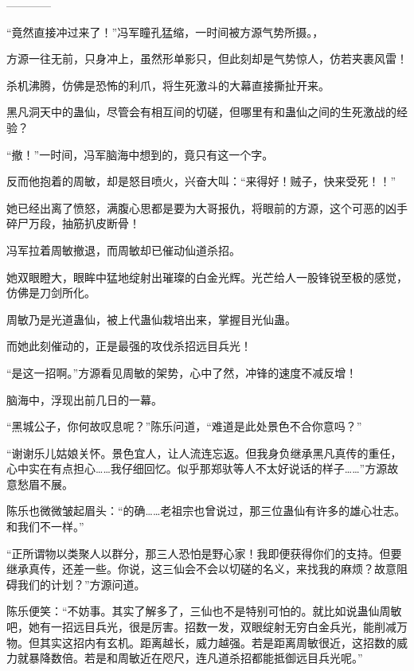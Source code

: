 
\begin{this_body}

------------

“竟然直接冲过来了！”冯军瞳孔猛缩，一时间被方源气势所摄。，

方源一往无前，只身冲上，虽然形单影只，但此刻却是气势惊人，仿若夹裹风雷！

杀机沸腾，仿佛是恐怖的利爪，将生死激斗的大幕直接撕扯开来。

黑凡洞天中的蛊仙，尽管会有相互间的切磋，但哪里有和蛊仙之间的生死激战的经验？

“撤！”一时间，冯军脑海中想到的，竟只有这一个字。

反而他抱着的周敏，却是怒目喷火，兴奋大叫：“来得好！贼子，快来受死！！”

她已经出离了愤怒，满腹心思都是要为大哥报仇，将眼前的方源，这个可恶的凶手碎尸万段，抽筋扒皮断骨！

冯军拉着周敏撤退，而周敏却已催动仙道杀招。

她双眼瞪大，眼眸中猛地绽射出璀璨的白金光辉。光芒给人一股锋锐至极的感觉，仿佛是刀剑所化。

周敏乃是光道蛊仙，被上代蛊仙栽培出来，掌握目光仙蛊。

而她此刻催动的，正是最强的攻伐杀招远目兵光！

“是这一招啊。”方源看见周敏的架势，心中了然，冲锋的速度不减反增！

脑海中，浮现出前几日的一幕。

“黑城公子，你何故叹息呢？”陈乐问道，“难道是此处景色不合你意吗？”

“谢谢乐儿姑娘关怀。景色宜人，让人流连忘返。但我身负继承黑凡真传的重任，心中实在有点担心……我仔细回忆。似乎那郑驮等人不太好说话的样子……”方源故意愁眉不展。

陈乐也微微皱起眉头：“的确……老祖宗也曾说过，那三位蛊仙有许多的雄心壮志。和我们不一样。”

“正所谓物以类聚人以群分，那三人恐怕是野心家！我即便获得你们的支持。但要继承真传，还差一些。你说，这三仙会不会以切磋的名义，来找我的麻烦？故意阻碍我们的计划？”方源问道。

陈乐便笑：“不妨事。其实了解多了，三仙也不是特别可怕的。就比如说蛊仙周敏吧，她有一招远目兵光，很是厉害。招数一发，双眼绽射无穷白金兵光，能削减万物。但其实这招内有玄机。距离越长，威力越强。若是距离周敏很近，这招数的威力就暴降数倍。若是和周敏近在咫尺，连凡道杀招都能抵御远目兵光呢。”


\end{this_body}
